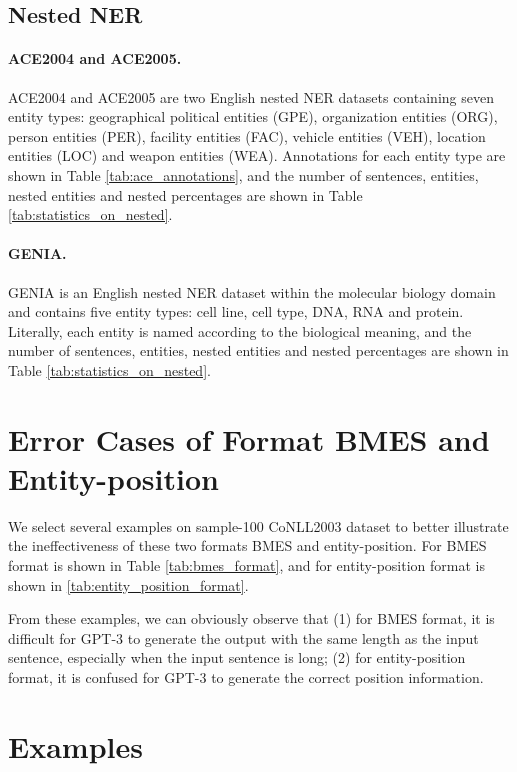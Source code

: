 \documentclass{article}
\begin{document}
\subsection{Nested NER}
\label{nested_ner_datasets_details}

\paragraph{ACE2004 and ACE2005.} ACE2004 \cite{doddington2004automatic} and ACE2005 \cite{christopher2006ace} are two English nested NER datasets containing seven entity types: geographical political entities (GPE), organization entities (ORG), person entities (PER), facility entities (FAC), vehicle entities (VEH), location entities (LOC) and weapon entities (WEA). Annotations for each entity type are shown in Table \ref{tab:ace_annotations}, and the number of sentences, entities, nested entities and nested percentages are shown in Table \ref{tab:statistics_on_nested}.

\paragraph{GENIA.} GENIA is an English nested NER dataset within the molecular biology domain and contains five entity types: cell line, cell type, DNA, RNA and protein. Literally, each entity is named according to the biological meaning, and the number of sentences, entities, nested entities and nested percentages are shown in Table \ref{tab:statistics_on_nested}.

\section{Error Cases of Format BMES and Entity-position}
\label{error_format_example}

We select several examples on sample-100 CoNLL2003 dataset to better illustrate the ineffectiveness of these two formats BMES and entity-position. For BMES format is shown in Table \ref{tab:bmes_format}, and for entity-position format is shown in \ref{tab:entity_position_format}.

From these examples, we can obviously observe that (1) for BMES format, it is difficult for GPT-3 to generate the output with the same length as the input sentence, especially when the input sentence is long; (2) for entity-position format, it is confused for GPT-3 to generate the correct position information.

\section{Examples}
\label{demonstrations_examples}
\end{document}
